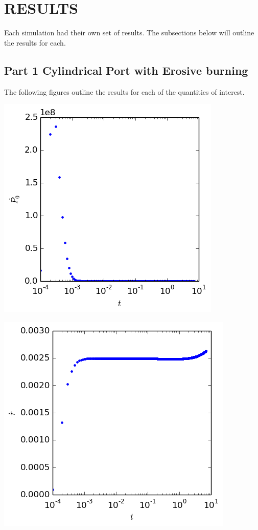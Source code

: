 \documentclass[cleanfoot,cleanhead,twocolumn,10pt,notitlepage]{asme2e}
\begin{document}
\section{RESULTS}

Each simulation had their own set of results.  The subsections below will outline the results for each.

\subsection{Part 1 Cylindrical Port with Erosive burning}

The following figures outline the results for each of the quantities of interest.

\includegraphics[width=\linewidth]{../python_stuff/Part1/P0_dot.png}

\includegraphics[width=\linewidth]{../python_stuff/Part1/r_dot.png}
\end{document}
